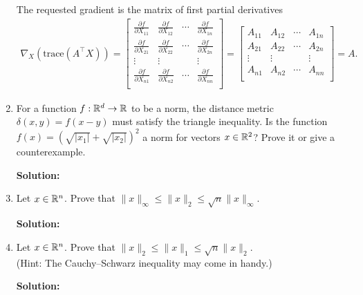 \documentclass{article}
\newcommand{\solution}{\textbf{Solution: }}
\begin{document}
\begin{enumerate}[label=(\alph*)]
\begin{mdframed}
      The requested gradient is the matrix of first partial derivatives
      \begin{align*}
        \nabla_X (\text{trace}(A^{\top}X)) =
        \begin{bmatrix}
          \frac{\partial f}{\partial X_{11}} & \frac{\partial f}{\partial X_{12}} & \cdots & \frac{\partial f}{\partial X_{1n}} \\
          \frac{\partial f}{\partial X_{21}} & \frac{\partial f}{\partial X_{22}} & \cdots & \frac{\partial f}{\partial X_{2n}} \\
          \vdots                            & \vdots                             &        & \vdots                             \\
          \frac{\partial f}{\partial X_{n1}} & \frac{\partial f}{\partial X_{n2}} & \cdots & \frac{\partial f}{\partial X_{nn}} \\
        \end{bmatrix}
        =
        \begin{bmatrix}
          A_{11}  & A_{12} & \cdots & A_{1n} \\
          A_{21}  & A_{22} & \cdots & A_{2n} \\
          \vdots & \vdots &        & \vdots \\
          A_{n1}  & A_{n2} & \cdots & A_{nn} \\
        \end{bmatrix}
        = A.
      \end{align*}
    \end{mdframed}

    \item For a function $f: \mathbb{R}^d \rightarrow \mathbb{R}$ to be a norm, the distance metric $\delta(x, y) = f(x-y)$  must satisfy the triangle inequality. Is the function $f(x) = (\sqrt{|x_1|} + \sqrt{|x_2|})^2$ a norm for vectors $x \in \mathbb{R}^2$? Prove it or give a counterexample.
    \begin{mdframed} \solution
    \end{mdframed}

    \item Let $x \in \mathbb{R}^n$. Prove that $\lVert x \rVert_{\infty} \leq \lVert x\rVert_2 \leq \sqrt{n} \lVert x \rVert_{\infty}$.
    \begin{mdframed} \solution
    \end{mdframed}

    \item Let $x \in \mathbb{R}^n$. Prove that $\lVert x \rVert_2 \leq \lVert x \rVert_1 \leq \sqrt{n} \lVert x \rVert_2$. \\
    (Hint: The Cauchy–Schwarz inequality may come in handy.)
    \begin{mdframed} \solution
    \end{mdframed}

\end{enumerate}
\end{document}
